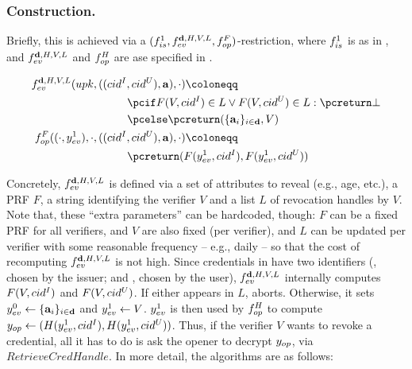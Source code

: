 \subsubsection{\CUASRAC Construction.} %
Briefly, this is achieved via a $(f_{is}^1,f_{ev}^{\mathbf{d},H,V,L},
f_{op}^{F})$-\CUASGenInt restriction, where $f_{is}^1$ is as in
, and $f_{ev}^{\mathbf{d},H,V,L}$ and $f_{op}^{H}$
are ase specified in .

\begin{align}
  \feval^{\dattrs,H,V,L}(\upk,((\cidi,\cidu),\attrs),\cdot) \coloneqq &
    \nonumber \\
  & \hspace*{-10em} \pcif F(V,\cidi) \in L \lor F(V,\cidu) \in L: \pcreturn \bot
  \nonumber \\
  & \hspace*{-10em} \pcelse \pcreturn (\lbrace \attrs_i \rbrace_{i\in \dattrs},V) \nonumber \\
  \finsp^{F}((\cdot,\yeval^1),\cdot,((\cidi,\cidu),\attrs),\cdot)
  \coloneqq  & \nonumber \\
  & \hspace*{-10em} \pcreturn (F(\yeval^1,\cidi),F(\yeval^1,\cidu))
  \label{eq:funcs-rac}
\end{align}

Concretely, $f_{ev}^{\mathbf{d},H,V,L}$ is defined via a set of attributes \dattrs
to reveal (e.g., age, etc.), a PRF $F$, a string identifying the verifier $V$
and a list $L$ of revocation handles by $V$. Note that, these ``extra
parameters'' can be hardcoded, though: $F$ can be a fixed PRF for all verifiers,
\dattrs and $V$ are also fixed (per verifier), and $L$ can be updated per
verifier with some reasonable frequency -- e.g., daily -- so that the cost of
recomputing $f_{ev}^{\mathbf{d},H,V,L}$ is not high.
%
Since credentials in \CUASGenInt have two identifiers (\cidi, chosen by the
issuer; and \cidu, chosen by the user), $f_{ev}^{\mathbf{d},H,V,L}$ internally
computes $F(V,cid^I)$ and $F(V,cid^U)$. If either appears in $L$, \feval aborts.
Otherwise, it sets $y_{ev}^0 \gets \lbrace \mathbf{a}_i \rbrace_{i\in\mathbf{d}}$ and
$y_{ev}^1 \gets V$. $y_{ev}^1$ is
then used by $f_{op}^H$ to compute $y_{op} \gets (H(y_{ev}^1,cid^I),
H(y_{ev}^1,cid^U))$. Thus, if the verifier $V$ wants to revoke a credential, all
it has to do is ask the opener to decrypt $y_{op}$, via $RetrieveCredHandle$.
%
In more detail, the algorithms are as follows:

